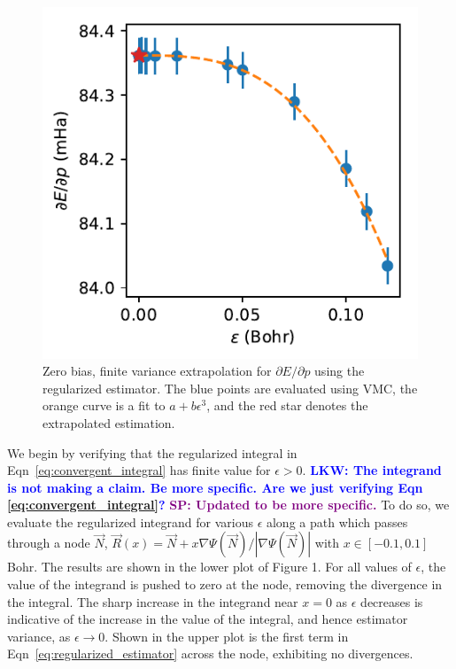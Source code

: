 \documentclass[twocolumn]{revtex4-1}
\newcommand{\lucas}[1]{\textbf{\textcolor{blue}{LKW: #1}}}
\newcommand{\shivesh}[1]{\textbf{\textcolor{purple}{SP: #1}}}
\begin{document}
\begin{figure}
\includegraphics{../2_plots/dedp.pdf}
\caption{Zero bias, finite variance extrapolation for $\partial E/\partial p$ using the regularized estimator. The blue points are evaluated using VMC, the orange curve is a fit to $a + b\epsilon^3$, and the red star denotes the extrapolated estimation. }
\end{figure}

We begin by verifying that the regularized integral in Eqn~\ref{eq:convergent_integral} has finite value for $\epsilon > 0$. \lucas{The integrand is not making a claim. Be more specific. Are we just verifying Eqn \ref{eq:convergent_integral}?}
\shivesh{Updated to be more specific.}
To do so, we evaluate the regularized integrand for various $\epsilon$ along a path which passes through a node $\vec{N}$, $\vec{R}(x) = \vec{N} + x \nabla \Psi(\vec{N})/|\nabla \Psi(\vec{N})|$ with $x \in [-0.1, 0.1]$ Bohr.
The results are shown in the lower plot of Figure 1.
For all values of $\epsilon$, the value of the integrand is pushed to zero at the node, removing the divergence in the integral.
The sharp increase in the integrand near $x=0$ as $\epsilon$ decreases is indicative of the increase in the value of the integral, and hence estimator variance, as $\epsilon \rightarrow 0$.
Shown in the upper plot is the first term in Eqn~\ref{eq:regularized_estimator} across the node, exhibiting no divergences.
\end{document}
